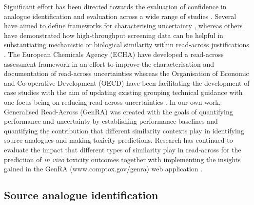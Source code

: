 \documentclass[
  super,
  preprint,
  3p]{elsarticle}
\begin{document}
Significant effort has been directed towards the evaluation of
confidence in analogue identification and evaluation across a wide range
of studies
\citep{patlewicz_building_2015, blackburn_framework_2014, schultz_assessing_2019, wu_framework_2010, patlewicz_navigating_2018}.
Several have aimed to define frameworks for characterising uncertainty
\citep{schultz_assessing_2019, schultz_strategy_2015, blackburn_framework_2014, patlewicz_navigating_2018},
whereas others have demonstrated how high-throughput screening data can
be helpful in substantiating mechanistic or biological similarity within
read-across justifications
\citep{escher_towards_2019, patlewicz_navigating_2018, rovida_nam-supported_2021}.
The European Chemicals Agency (ECHA) have developed a read-across
assessment framework in an effort to improve the characterisation and
documentation of read-across uncertainties
\citep{european_chemicals_agency_read-across_2017} whereas the
Organisation of Economic and Co-operative Development (OECD) have been
facilitating the development of case studies with the aim of updating
existing grouping technical guidance \citep{oecd_guidance_2014} with one
focus being on reducing read-across uncertainties \citep{OECD_IATA}. In
our own work, Generalised Read-Across (GenRA)
\citep{shah_systematically_2016, patlewicz_towards_2023} was created
with the goals of quantifying performance and uncertainty by
establishing performance baselines and quantifying the contribution that
different similarity contexts play in identifying source analogues and
making toxicity predictions. Research has continued to evaluate the
impact that different types of similarity play in read-across for the
prediction of \emph{in vivo} toxicity outcomes
\citep{patlewicz_systematic_2024, tate_repeat-dose_2021, helman_extending_2018, nelms_mechanistic_2018, boyce_comparing_2022}
together with implementing the insights gained in the GenRA
(www.comptox.gov/genra) web application
\citep{patlewicz_towards_2023, shah_genra_2024}.

\subsection{Source analogue
identification}\label{source-analogue-identification}
\end{document}

